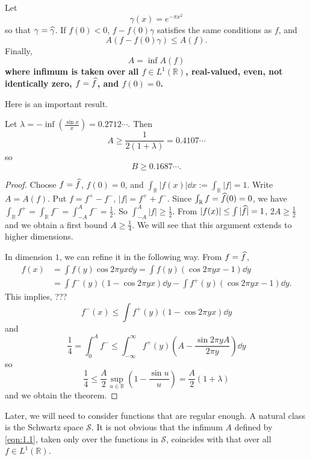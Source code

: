 Let
\[
    \gamma(x) = e^{-\pi x^2}
\]
so that $\gamma = \widehat{\gamma}$.
If $f(0) < 0$, $f - f(0)\gamma$ satisfies the same conditions as $f$, and
\[
    A(f - f(0)\gamma) \leq A(f).
\]
Finally,
\begin{equation}
\label{eqn:1.1}
    A = \inf A(f)
\end{equation}
\textbf{where infimum is taken over all $f \in L^{1}(\mathbb{R})$, real-valued, even, not identically zero, $f = \widehat{f}$, and $f(0) = 0$.}

Here is an important result.

\begin{theorem}
Let $\lambda = -\inf\left( \frac{\sin x}{x}\right) = 0.2712\cdots$.
Then
\[
    A \geq \frac{1}{2(1 + \lambda)} = 0.4107\cdots
\]
so
\[
    B \geq 0.1687\cdots.
\]
\end{theorem}
\begin{proof}
Choose $f = \widehat{f}$, $f(0) = 0$, and $\int_{\mathbb{R}} |f(x)| \dd x := \int_{\mathbb{R}} |f| = 1$.
Write $A = A(f)$.
Put $f = f^{+} - f^{-}$, $|f| = f^{+} + f^{-}$.
Since $\int_{\mathbb{R}}f = \widehat{f}(0) = 0$, we have $\int_{\mathbb{R}} f^{+} = \int_{\mathbb{R}} f^{-} = \int_{-A}^{A} f^{-} = \frac{1}{2}$.
So $\int_{-A}^{A} |f| \geq \frac{1}{2}$.
From $|f(x)| \leq \int |\widehat{f}| = 1$, $2A \geq \frac{1}{2}$ and we obtain a first bound $A \geq \frac{1}{4}$.
We will see that this argument extends to higher dimensions.

In dimension $1$, we can refine it in the following way.
From $f = \widehat{f}$,
\begin{align*}
    f(x) &= \int f(y) \cos 2 \pi y x \dd y = \int f(y) (\cos 2 \pi y x - 1) \dd y \\
    &= \int f^{-}(y) (1 - \cos 2 \pi y x) \dd y - \int f^{+}(y) (\cos 2 \pi y x - 1) \dd y.
\end{align*}
This implies, ???
\[
    f^{-}(x) \leq \int f^{+}(y) (1 - \cos 2 \pi y x) \dd y
\]
and
\[
    \frac{1}{4} = \int_{0}^{A} f^{-} \leq \int_{-\infty}^{\infty} f^{+}(y) \left(A - \frac{\sin 2 \pi y A}{2 \pi y}\right) \dd y
\]
so
\[
    \frac{1}{4} \leq \frac{A}{2}\sup_{u \in \mathbb{R}} \left(1 - \frac{\sin u}{u}\right) = \frac{A}{2}(1 + \lambda)
\]
and we obtain the theorem.
\end{proof}
Later, we will need to consider functions that are regular enough.
A natural class is the Schwartz space $\mathcal{S}$.
It is not obvious that the infimum $A$ defined by \eqref{eqn:1.1}, taken only over the functions in $\mathcal{S}$, coincides with that over all $f \in L^{1}(\mathbb{R})$.

